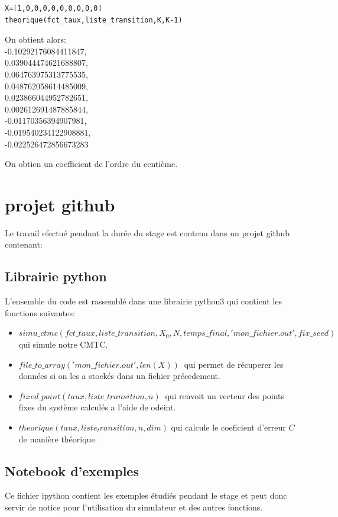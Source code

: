 \documentclass[a4paper]{article}
\begin{document}
\begin{lstlisting}[frame=single]
X=[1,0,0,0,0,0,0,0,0,0]
theorique(fct_taux,liste_transition,K,K-1)
\end{lstlisting}

On obtient alors: \\
-0.10292176084411847, \\
 0.039044474621688807, \\
 0.064763975313775535,\\
 0.048762058614485009,\\
 0.023866044952782651,\\
 0.002612691487885844,\\
 -0.01170356394907981,\\
 -0.019540234122908881,\\
 -0.022526472856673283 

 On obtien un coefficient de l'ordre du centième.

 \section{projet github}
 Le travail efectué pendant la durée du stage est contenu dans un
 projet github\cite{librairie} contenant:
\subsection{Librairie python}
L'ensemble du code est rassemblé dans une librairie python3
 qui
contient les fonctions suivantes:
\begin{itemize}
  \item
    $simu\_ctmc(fct\_taux,liste\_transition,X_0,N,temps\_final,'mon\_fichier.out',fix\_seed)
    \ $
    qui simule notre CMTC.
  \item $file\_to\_array('mon\_fichier.out',len(X)) \ $ qui permet de
    récuperer les données si on les a stockés dans un fichier
    précedement.
  \item $fixed\_point(taux,liste\_transition,n) \ $ qui renvoit un vecteur
    des points fixes du système calculés a l'aide de odeint.
  \item $theorique(taux,liste_transition,n,dim)$ qui calcule le
    coeficient d'erreur $C \ $ de manière théorique.
\end{itemize}

\subsection{Notebook d'exemples}
Ce fichier ipython contient les exemples étudiés pendant le stage et
peut donc servir de notice pour l'utilisation du simulateur et des
autres fonctions.
\end{document}
